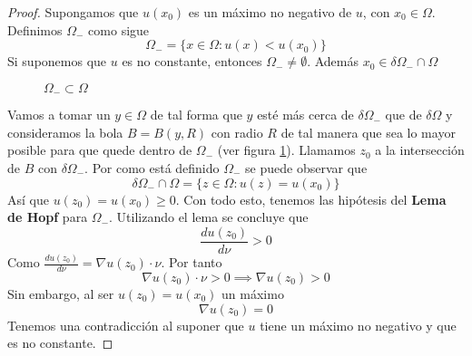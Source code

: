 \begin{proof}
Supongamos que $u(x_0)$ es un máximo no negativo de $u$, con $x_0\in\Omega$.
Definimos $\Omega_{-}$ como sigue
$$\Omega_{-} = \{x\in\Omega: u(x) < u(x_0)\}$$
Si suponemos que $u$ es no constante, entonces $\Omega_{-}\neq \emptyset$. Además $x_0\in\delta\Omega_{-}\cap\Omega$


\begin{figure}[ht]
\centering


\caption{$\Omega_{-}\subset\Omega$}
\label{fig:omegamenos}
\end{figure}

\noindent Vamos a tomar un $y\in\Omega$ de tal forma que $y$ esté más cerca de $\delta\Omega_{-}$ que de $\delta\Omega$ y consideramos la bola $B=B(y,R)$ con radio $R$ de tal manera que sea lo mayor posible para que quede dentro de $\Omega_{-}$ (ver figura \ref{fig:omegamenos}).
Llamamos $z_0$ a la intersección de $B$ con $\delta\Omega_{-}$.
Por como está definido $\Omega_{-}$ se puede observar que
$$\delta\Omega_{-}\cap\Omega = \{z\in\Omega: u(z) = u(x_0)\}$$
Así que $u(z_0) = u(x_0) \ge 0$.
Con todo esto, tenemos las hipótesis del \textbf{Lema de Hopf} para $\Omega_{-}$. Utilizando el lema se concluye que
$$\frac{du(z_0)}{d\nu} > 0$$
Como $\frac{du(z_0)}{d\nu} = \nabla u(z_0)\cdot \nu$. Por tanto $$\nabla u(z_0) \cdot \nu > 0\implies \nabla u(z_0) > 0$$
Sin embargo, al ser $u(z_0) = u(x_0)$ un máximo
$$\nabla u(z_0) = 0$$
Tenemos una contradicción al suponer que $u$ tiene un máximo no negativo y que es no constante.
\end{proof}